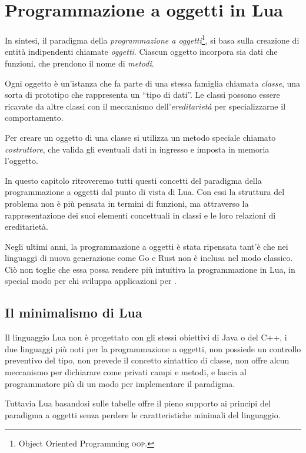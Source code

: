 
\chapter{Programmazione a oggetti in Lua}
\label{chFondOop}

In sintesi, il paradigma della \emph{programmazione a oggetti}\footnote{Object
Oriented Programming \textsc{oop}.}, si basa sulla creazione di entità
indipendenti chiamate \emph{oggetti}. Ciascun oggetto incorpora sia dati che
funzioni, che prendono il nome di \emph{metodi}.

Ogni oggetto è un'istanza che fa parte di una stessa famiglia chiamata
\emph{classe}, una sorta di prototipo che rappresenta un ``tipo di dati''. Le
classi possono essere ricavate da altre classi con il meccanismo
dell'\emph{ereditarietà} per specializzarne il comportamento.

Per creare un oggetto di una classe si utilizza un metodo speciale chiamato
\emph{costruttore}, che valida gli eventuali dati in ingresso e imposta in
memoria l'oggetto.

In questo capitolo ritroveremo tutti questi concetti del paradigma della
programmazione a oggetti dal punto di vista di Lua. Con essi la struttura del
problema non è più pensata in termini di funzioni, ma attraverso la
rappresentazione dei suoi elementi concettuali in classi e le loro relazioni di
ereditarietà.

Negli ultimi anni, la programmazione a oggetti è stata ripensata tant'è che nei
linguaggi di nuova generazione come Go e Rust non è inclusa nel modo classico.
Ciò non toglie che essa possa rendere più intuitiva la programmazione in Lua, in
special modo per chi sviluppa applicazioni per \LuaTeX.


\section{Il minimalismo di Lua}

Il linguaggio Lua non è progettato con gli stessi obiettivi di Java o del C++, i
due linguaggi più noti per la programmazione a oggetti, non possiede un
controllo preventivo del tipo, non prevede il concetto sintattico di classe, non
offre alcun meccanismo per dichiarare come privati campi e metodi, e lascia al
programmatore più di un modo per implementare il paradigma.

Tuttavia Lua basandosi sulle tabelle offre il pieno supporto ai principi del
paradigma a oggetti senza perdere le caratteristiche minimali del linguaggio.


